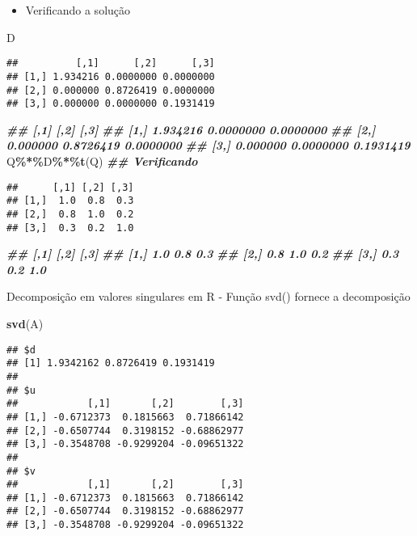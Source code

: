 \documentclass[
]{article}
\newenvironment{Shaded}{\begin{snugshade}}{\end{snugshade}}
\newcommand{\DocumentationTok}[1]{\textcolor[rgb]{0.56,0.35,0.01}{\textbf{\textit{#1}}}}
\newcommand{\FunctionTok}[1]{\textcolor[rgb]{0.13,0.29,0.53}{\textbf{#1}}}
\newcommand{\NormalTok}[1]{#1}
\newcommand{\SpecialCharTok}[1]{\textcolor[rgb]{0.81,0.36,0.00}{\textbf{#1}}}
\providecommand{\tightlist}{%
  \setlength{\itemsep}{0pt}\setlength{\parskip}{0pt}}
\begin{document}
\begin{itemize}
\tightlist
\item
  Verificando a solução
\end{itemize}

\begin{Shaded}
\begin{Highlighting}[]
\NormalTok{D}
\end{Highlighting}
\end{Shaded}

\begin{verbatim}
##          [,1]      [,2]      [,3]
## [1,] 1.934216 0.0000000 0.0000000
## [2,] 0.000000 0.8726419 0.0000000
## [3,] 0.000000 0.0000000 0.1931419
\end{verbatim}

\begin{Shaded}
\begin{Highlighting}[]
\DocumentationTok{\#\# [,1] [,2] [,3]}
\DocumentationTok{\#\# [1,] 1.934216 0.0000000 0.0000000}
\DocumentationTok{\#\# [2,] 0.000000 0.8726419 0.0000000}
\DocumentationTok{\#\# [3,] 0.000000 0.0000000 0.1931419}
\NormalTok{Q}\SpecialCharTok{\%*\%}\NormalTok{D}\SpecialCharTok{\%*\%}\FunctionTok{t}\NormalTok{(Q) }\DocumentationTok{\#\# Verificando}
\end{Highlighting}
\end{Shaded}

\begin{verbatim}
##      [,1] [,2] [,3]
## [1,]  1.0  0.8  0.3
## [2,]  0.8  1.0  0.2
## [3,]  0.3  0.2  1.0
\end{verbatim}

\begin{Shaded}
\begin{Highlighting}[]
\DocumentationTok{\#\# [,1] [,2] [,3]}
\DocumentationTok{\#\# [1,] 1.0 0.8 0.3}
\DocumentationTok{\#\# [2,] 0.8 1.0 0.2}
\DocumentationTok{\#\# [3,] 0.3 0.2 1.0}
\end{Highlighting}
\end{Shaded}

Decomposição em valores singulares em R - Função svd() fornece a
decomposição

\begin{Shaded}
\begin{Highlighting}[]
\FunctionTok{svd}\NormalTok{(A)}
\end{Highlighting}
\end{Shaded}

\begin{verbatim}
## $d
## [1] 1.9342162 0.8726419 0.1931419
## 
## $u
##            [,1]       [,2]        [,3]
## [1,] -0.6712373  0.1815663  0.71866142
## [2,] -0.6507744  0.3198152 -0.68862977
## [3,] -0.3548708 -0.9299204 -0.09651322
## 
## $v
##            [,1]       [,2]        [,3]
## [1,] -0.6712373  0.1815663  0.71866142
## [2,] -0.6507744  0.3198152 -0.68862977
## [3,] -0.3548708 -0.9299204 -0.09651322
\end{verbatim}
\end{document}
